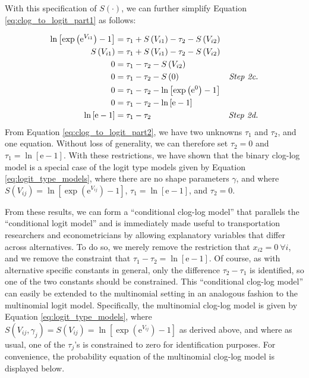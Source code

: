With this specification of $S \left( \cdot \right)$, we can further simplify Equation \ref{eq:clog_to_logit_part1} as follows:

\begin{equation}
\label{eq:clog_to_logit_part2}
\begin{aligned}
\ln \left[ \exp \left( \mathrm{e}^{V_{i1}} \right) - 1 \right]  &= \tau_1 + S \left( V_{i1} \right) - \tau_2 - S \left( V_{i2} \right)\\
S \left( V_{i1} \right) &=  \tau_1 + S \left( V_{i1} \right) - \tau_2 - S \left( V_{i2} \right) \\
0 &=  \tau_1 - \tau_2 - S \left( V_{i2} \right) \\
0 &= \tau_1 - \tau_2 - S \left( 0 \right) \qquad &\textrm{\textit{Step 2c.}}\\
0 &= \tau_1 - \tau_2 - \ln \left[ \exp \left( \mathrm{e}^{0} \right) - 1 \right] \\
0 &= \tau_1 - \tau_2 - \ln \left[ \mathrm{e} - 1 \right] \\
\ln \left[ \mathrm{e} - 1 \right] &= \tau_1 - \tau_2  \qquad &\textrm{\textit{Step 2d.}}
\end{aligned}
\end{equation}
From Equation \ref{eq:clog_to_logit_part2}, we have two unknowns $\tau_1$ and $\tau_2$, and one equation. Without loss of generality, we can therefore set $\tau_2 = 0$ and $\tau_1 = \ln \left[ \mathrm{e} - 1 \right]$. With these restrictions, we have shown that the binary clog-log model is a special case of the logit type models given by Equation \ref{eq:logit_type_models}, where there are no shape parameters $\gamma$, and where $S \left( V_{ij} \right) = \ln \left[ \exp \left( \mathrm{e}^{V_{ij}} \right) - 1 \right]$, $\tau_1 = \ln \left[ \mathrm{e} - 1 \right]$, and $\tau_2 = 0$.

From these results, we can form a ``conditional clog-log model'' that parallels the ``conditional logit model'' \citep{mcfadden_conditional_1972} and is immediately made useful to transportation researchers and econometricians by allowing explanatory variables that differ across alternatives. To do so, we merely remove the restriction that $x_{i2} = 0 \ \forall i$, and we remove the constraint that $ \tau_1 - \tau_2 = \ln \left[ \mathrm{e} - 1 \right]$. Of course, as with alternative specific constants in general, only the difference $\tau_2 - \tau_1$ is identified, so one of the two constants should be constrained. This ``conditional clog-log model'' can easily be extended to the multinomial setting in an analogous fashion to the multinomial logit model. Specifically, the multinomial clog-log model is given by Equation \ref{eq:logit_type_models}, where $S \left( V_{ij}, \gamma_j \right) = S \left( V_{ij} \right) =  \ln \left[ \exp \left( \mathrm{e}^{V_{ij}} \right) - 1 \right]$ as derived above, and where as usual, one of the $\tau_j$'s is constrained to zero for identification purposes. For convenience, the probability equation of the multinomial clog-log model is displayed below.


